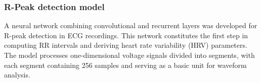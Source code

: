 \documentclass{citask}
\begin{document}
\subsubsection{R-Peak detection model}
A neural network combining convolutional and recurrent layers was developed for R-peak detection in ECG recordings. This network constitutes the first step in computing RR intervals and deriving heart rate variability (HRV) parameters. The model processes one-dimensional voltage signals divided into segments, with each segment containing 256 samples and serving as a basic unit for waveform analysis.
\end{document}
